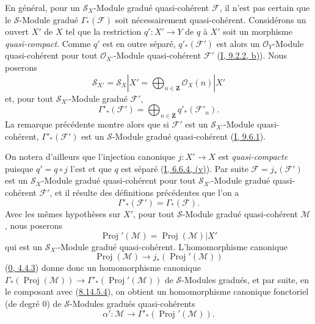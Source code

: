 \begin{env}[8.14.6]
\label{II.8.14.6-fr}
En général, pour un $\mathcal{S}_X$-Module gradué quasi-cohérent
$\mathcal{F}$, il n'est pas certain que le $\mathcal{S}$-Module gradué
$\Gamma_*(\mathcal{F})$ soit nécessairement quasi-cohérent. Considérons un
ouvert $X'$ de $X$ tel que la restriction $q':X'\to Y$ de $q$ à $X'$ soit
un morphisme \emph{quasi-compact}. Comme $q'$ est en outre séparé,
$q'_*(\mathcal{F}')$ est alors un $\mathcal{O}_Y$-Module quasi-cohérent pour
tout $\mathcal{O}_{X'}$-Module quasi-cohérent $\mathcal{F}'$
(\hyperref[I.9.2.2-fr]{I, 9.2.2, b)}). Nous poserons
\begin{equation}
\label{II.8.14.6.1-fr}
  \mathcal{S}_{X'}=\mathcal{S}_X|X'
  =\bigoplus_{n\in\mathbf{Z}}\mathcal{O}_X(n)|X'
\tag{8.14.6.1}
\end{equation}
et, pour tout $\mathcal{S}_{X'}$-Module gradué $\mathcal{F}'$,
\begin{equation}
\label{II.8.14.6.2-fr}
  \Gamma'_*(\mathcal{F}')=
  \bigoplus_{n\in\mathbf{Z}}q'_*(\mathcal{F}'_n).
\tag{8.14.6.2}
\end{equation}
La remarque précédente montre alors que si $\mathcal{F}'$ est un
$\mathcal{S}_{X'}$-Module quasi-cohérent, $\Gamma'_*(\mathcal{F}')$ est un
$\mathcal{S}$-Module gradué quasi-cohérent
(\hyperref[I.9.6.1-fr]{I, 9.6.1}).

On notera d'ailleurs que l'injection canonique $j:X'\to X$ est
\emph{quasi-compacte} puisque $q'=q\circ j$ l'est et que $q$ est séparé
(\hyperref[I.6.6.4-fr]{I, 6.6.4, (v)}). Par suite
$\mathcal{F}=j_*(\mathcal{F}')$ est un $\mathcal{S}_X$-Module gradué
quasi-cohérent pour tout $\mathcal{S}_{X'}$-Module gradué quasi-cohérent
$\mathcal{F}'$, et il résulte des définitions précédentes que l'on a
\begin{equation}
\label{II.8.14.6.3-fr}
  \Gamma'_*(\mathcal{F}')=\Gamma_*(\mathcal{F}).
\tag{8.14.6.3}
\end{equation}
Avec les mêmes hypothèses sur $X'$, pour tout $\mathcal{S}$-Module gradué
quasi-cohérent $\mathcal{M}$, nous poserons
\begin{equation}
\label{II.8.14.6.4-fr}
  \operatorname{Proj}'(\mathcal{M})
  =\operatorname{Proj}(\mathcal{M})|X'
\tag{8.14.6.4}
\end{equation}
qui est un $\mathcal{S}_{X'}$-Module gradué quasi-cohérent. L'homomorphisme
canonique
\[
  \operatorname{Proj}(\mathcal{M})\to
  j_*(\operatorname{Proj}'(\mathcal{M}))
\]
(\hyperref[0.4.4.3-fr]{0, 4.4.3}) donne donc un homomorphisme canonique
$\Gamma_*(\operatorname{Proj}(\mathcal{M}))\to
\Gamma'_*(\operatorname{Proj}'(\mathcal{M}))$ de $\mathcal{S}$-Modules
gradués, et par suite, en le composant avec
(\hyperref[II.8.14.5.4-fr]{8.14.5.4}), on obtient un homomorphisme canonique
fonctoriel (de degré $0$) de $\mathcal{S}$-Modules gradués quasi-cohérents
\begin{equation}
\label{II.8.14.6.5-fr}
  \alpha':\mathcal{M}\to
  \Gamma'_*(\operatorname{Proj}'(\mathcal{M})).
\tag{8.14.6.5}
\end{equation}
\end{env}

